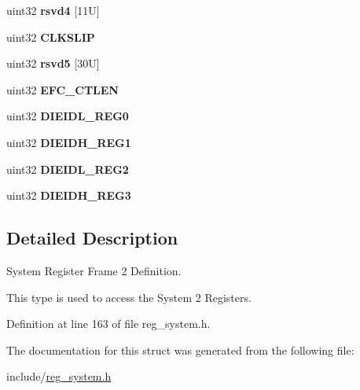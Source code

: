 \begin{DoxyCompactItemize}
\mbox{\label{structsystemBase2_a61dc29a9f9a37ca2cf37b3d8637b4ac8}} 
uint32 {\bfseries rsvd4} \mbox{[}11\+U\mbox{]}
\item 
\mbox{\label{structsystemBase2_ab56e0e53e78c61caf44452f0bef81eba}} 
uint32 {\bfseries C\+L\+K\+S\+L\+IP}
\item 
\mbox{\label{structsystemBase2_aeafe57e73df94bf8a6d4d1183e11ec50}} 
uint32 {\bfseries rsvd5} \mbox{[}30\+U\mbox{]}
\item 
\mbox{\label{structsystemBase2_a6236fe50a2bd44f8a15c340dc6ed6abf}} 
uint32 {\bfseries E\+F\+C\+\_\+\+C\+T\+L\+EN}
\item 
\mbox{\label{structsystemBase2_a6917e0d5c610ae68c9b8ebaebbd0a362}} 
uint32 {\bfseries D\+I\+E\+I\+D\+L\+\_\+\+R\+E\+G0}
\item 
\mbox{\label{structsystemBase2_aa27da01af099fda13ae4c97874458f95}} 
uint32 {\bfseries D\+I\+E\+I\+D\+H\+\_\+\+R\+E\+G1}
\item 
\mbox{\label{structsystemBase2_ace09ba1e51cfd3923695a1d4d091857e}} 
uint32 {\bfseries D\+I\+E\+I\+D\+L\+\_\+\+R\+E\+G2}
\item 
\mbox{\label{structsystemBase2_a4cc65202d2e97f166cb43237ac84b847}} 
uint32 {\bfseries D\+I\+E\+I\+D\+H\+\_\+\+R\+E\+G3}
\end{DoxyCompactItemize}


\subsection{Detailed Description}
System Register Frame 2 Definition. 

This type is used to access the System 2 Registers. 

Definition at line 163 of file reg\+\_\+system.\+h.



The documentation for this struct was generated from the following file\+:\begin{DoxyCompactItemize}
\item 
include/\mbox{\hyperlink{reg__system_8h}{reg\+\_\+system.\+h}}\end{DoxyCompactItemize}
